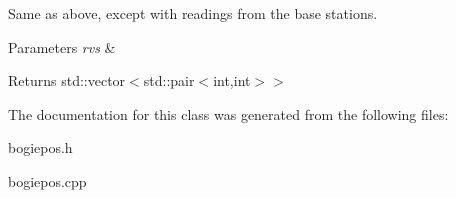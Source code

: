 Same as above, except with readings from the base stations. 


\begin{DoxyParams}{Parameters}
{\em rvs} & \\
\hline
\end{DoxyParams}
\begin{DoxyReturn}{Returns}
std\+::vector$<$std\+::pair$<$int,int$>$$>$ 
\end{DoxyReturn}


The documentation for this class was generated from the following files\+:\begin{DoxyCompactItemize}
\item 
bogiepos.\+h\item 
bogiepos.\+cpp\end{DoxyCompactItemize}
